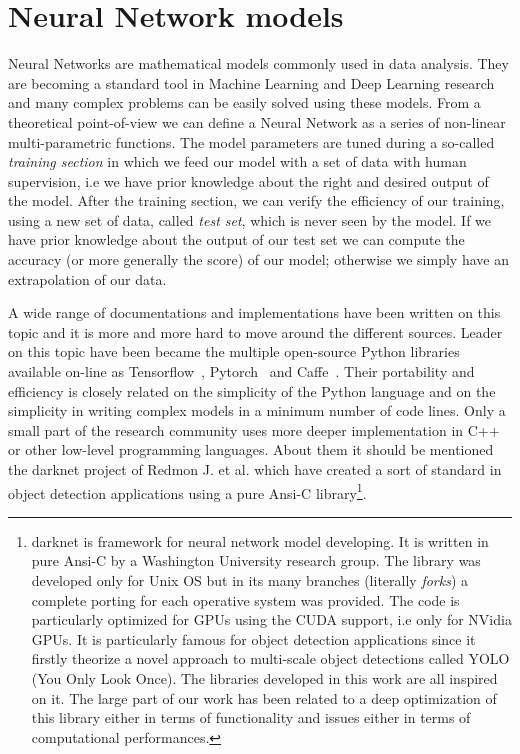 \documentclass{standalone}
\begin{document}
\section[Neural Network models]{Neural Network models}\label{NN:nn}

Neural Networks are mathematical models commonly used in data analysis.
They are becoming a standard tool in Machine Learning and Deep Learning research and many complex problems can be easily solved using these models.
From a theoretical point-of-view we can define a Neural Network as a series of non-linear multi-parametric functions.
The model parameters are tuned during a so-called \emph{training section} in which we feed our model with a set of data with human supervision, i.e we have prior knowledge about the right and desired output of the model.
After the training section, we can verify the efficiency of our training, using a new set of data, called \emph{test set}, which is never seen by the model.
If we have prior knowledge about the output of our test set we can compute the accuracy (or more generally the score) of our model; otherwise we simply have an extrapolation of our data.

A wide range of documentations and implementations have been written on this topic and it is more and more hard to move around the different sources.
Leader on this topic have been became the multiple open-source \textsf{Python} libraries available on-line as \textsf{Tensorflow}~\cite{tensorflow2015-whitepaper}, \textsf{Pytorch}~\cite{paszke2017automatic} and \textsf{Caffe}~\cite{Jia:2014:Caffe}.
Their portability and efficiency is closely related on the simplicity of the \textsf{Python} language and on the simplicity in writing complex models in a minimum number of code lines.
Only a small part of the research community uses more deeper implementation in \textsf{C++} or other low-level programming languages.
About them it should be mentioned the \textsf{darknet project} of Redmon J. et al. which have created a sort of standard in object detection applications using a pure \textsf{Ansi-C} library\footnote{
  \textsf{darknet} is framework for neural network model developing.
  It is written in pure \textsf{Ansi-C} by a Washington University research group.
  The library was developed only for Unix OS but in its many branches (literally \emph{forks}) a complete porting for each operative system was provided.
  The code is particularly optimized for GPUs using the CUDA support, i.e only for NVidia GPUs.
  It is particularly famous for object detection applications since it firstly theorize a novel approach to multi-scale object detections called YOLO (You Only Look Once).
  The libraries developed in this work are all inspired on it.
  The large part of our work has been related to a deep optimization of this library either in terms of functionality and issues either in terms of computational performances.
}.
\end{document}
